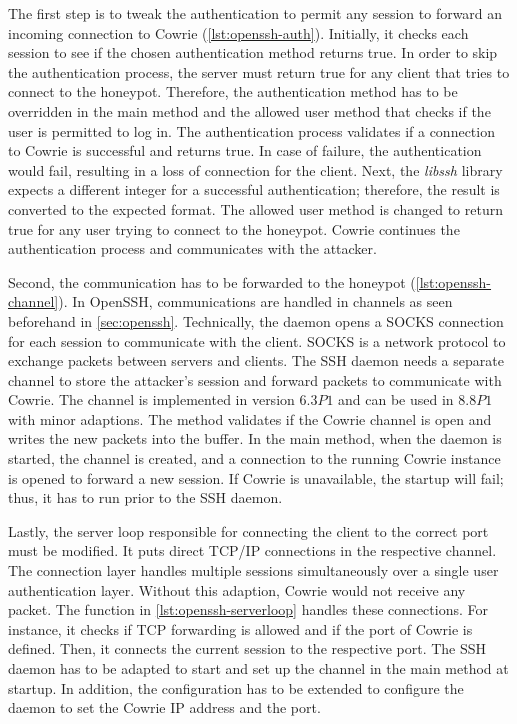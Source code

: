 The first step is to tweak the authentication to permit any session to forward an incoming connection to Cowrie (\autoref{lst:openssh-auth}).
Initially, it checks each session to see if the chosen authentication method returns true.
In order to skip the authentication process, the server must return true for any client that tries to connect to the honeypot.
Therefore, the authentication method has to be overridden in the main method and the allowed user method that checks if the user is permitted to log in.
The authentication process validates if a connection to Cowrie is successful and returns true.
In case of failure, the authentication would fail, resulting in a loss of connection for the client.
Next, the \textit{libssh} library expects a different integer for a successful authentication; therefore, the result is converted to the expected format.
The allowed user method is changed to return true for any user trying to connect to the honeypot.
Cowrie continues the authentication process and communicates with the attacker.

Second, the communication has to be forwarded to the honeypot (\autoref{lst:openssh-channel}).
In OpenSSH, communications are handled in channels as seen beforehand in \autoref{sec:openssh}.
Technically, the daemon opens a SOCKS connection for each session to communicate with the client.
SOCKS is a network protocol to exchange packets between servers and clients.
The SSH daemon needs a separate channel to store the attacker's session and forward packets to communicate with Cowrie.
The channel is implemented in version $6.3P1$ and can be used in $8.8P1$ with minor adaptions.
The method validates if the Cowrie channel is open and writes the new packets into the buffer.
In the main method, when the daemon is started, the channel is created, and a connection to the running Cowrie instance is opened to forward a new session.
If Cowrie is unavailable, the startup will fail; thus, it has to run prior to the SSH daemon.

Lastly, the server loop responsible for connecting the client to the correct port must be modified.
It puts direct TCP/IP connections in the respective channel.
The connection layer handles multiple sessions simultaneously over a single user authentication layer.
Without this adaption, Cowrie would not receive any packet.
The function in \autoref{lst:openssh-serverloop} handles these connections.
For instance, it checks if TCP forwarding is allowed and if the port of Cowrie is defined.
Then, it connects the current session to the respective port.
The SSH daemon has to be adapted to start and set up the channel in the main method at startup.
In addition, the configuration has to be extended to configure the daemon to set the Cowrie IP address and the port.


